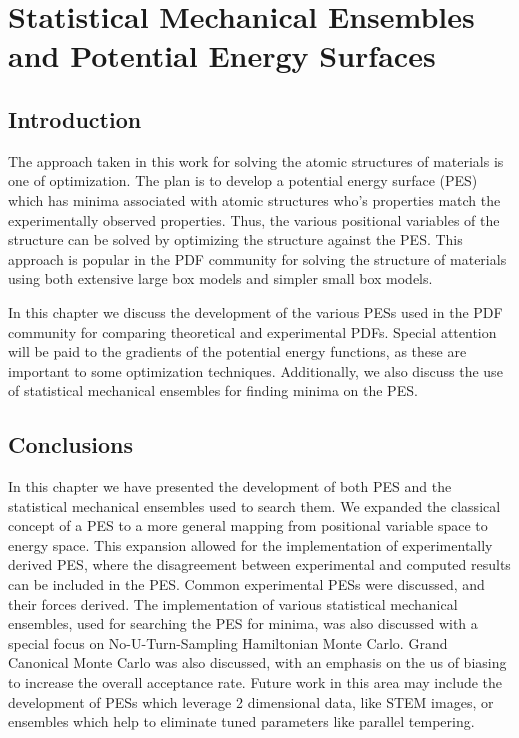 \chapter{Statistical Mechanical Ensembles and Potential Energy Surfaces} \label{ch:pes_e}
\section{Introduction}
The approach taken in this work for solving the atomic structures of materials is one of optimization.
The plan is to develop a potential energy surface (PES) which has minima associated with atomic structures who's properties match the experimentally observed properties.
Thus, the various positional variables of the structure can be solved by optimizing the structure against the PES.
This approach is popular in the PDF community for solving the structure of materials using both extensive large box models and simpler small box models.

In this chapter we discuss the development of the various PESs used in the PDF community for comparing theoretical and experimental PDFs.
Special attention will be paid to the gradients of the potential energy functions, as these are important to some optimization techniques.
Additionally, we also discuss the use of statistical mechanical ensembles for finding minima on the PES.





\section{Conclusions}
In this chapter we have presented the development of both PES and the statistical mechanical ensembles used to search them.
We expanded the classical concept of a PES to a more general mapping from positional variable space to energy space.
This expansion allowed for the implementation of experimentally derived PES, where the disagreement between experimental and computed results can be included in the PES.
Common experimental PESs were discussed, and their forces derived.
The implementation of various statistical mechanical ensembles, used for searching the PES for minima, was also discussed with a special focus on No-U-Turn-Sampling Hamiltonian Monte Carlo.
Grand Canonical Monte Carlo was also discussed, with an emphasis on the us of biasing to increase the overall acceptance rate.
Future work in this area may include the development of PESs which leverage 2 dimensional data, like STEM images, or ensembles which help to eliminate tuned parameters like parallel tempering.
